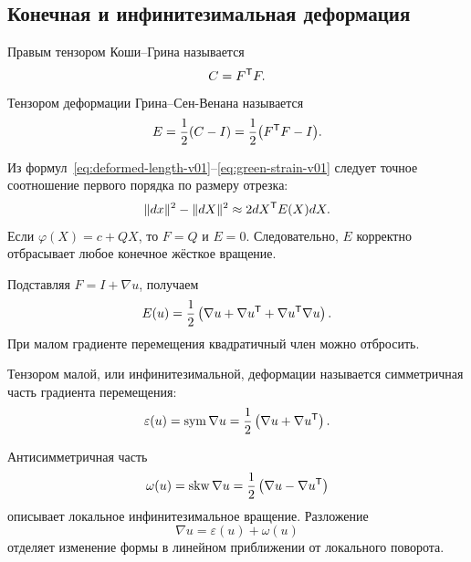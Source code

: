 \subsection{Конечная и инфинитезимальная деформация}

\begin{definition}
Правым тензором Коши--Грина называется
\begin{equation}
\label{eq:right-cauchy-green-v01}
C=F^{\mathsf{T}}F.
\end{equation}
Тензором деформации Грина--Сен-Венана называется
\begin{equation}
\label{eq:green-strain-v01}
E=\frac12(C-I)
=\frac12\bigl(F^{\mathsf{T}}F-I\bigr).
\end{equation}
\end{definition}

Из формул~\eqref{eq:deformed-length-v01}--\eqref{eq:green-strain-v01} следует точное соотношение первого порядка по размеру отрезка:
\begin{equation}
\label{eq:length-change-green-v01}
\lVert dx\rVert^2-\lVert dX\rVert^2
\approx
2dX^{\mathsf{T}}E(X)dX.
\end{equation}
Если $\varphi(X)=c+QX$, то $F=Q$ и $E=0$. Следовательно, $E$ корректно отбрасывает любое конечное жёсткое вращение.

Подставляя $F=I+\nabla u$, получаем
\begin{equation}
\label{eq:green-strain-expanded-v01}
E(u)
=
\frac12\left(
\nabla u+\nabla u^{\mathsf{T}}+\nabla u^{\mathsf{T}}\nabla u
\right).
\end{equation}
При малом градиенте перемещения квадратичный член можно отбросить.

\begin{definition}
Тензором малой, или инфинитезимальной, деформации называется симметричная часть градиента перемещения:
\begin{equation}
\label{eq:small-strain-v01}
\varepsilon(u)
=
\operatorname{sym}\nabla u
=
\frac12\left(\nabla u+\nabla u^{\mathsf{T}}\right).
\end{equation}
\end{definition}

Антисимметричная часть
\begin{equation}
\label{eq:infinitesimal-rotation-v01}
\omega(u)
=
\operatorname{skw}\nabla u
=
\frac12\left(\nabla u-\nabla u^{\mathsf{T}}\right)
\end{equation}
описывает локальное инфинитезимальное вращение. Разложение
\[
\nabla u=\varepsilon(u)+\omega(u)
\]
отделяет изменение формы в линейном приближении от локального поворота.

